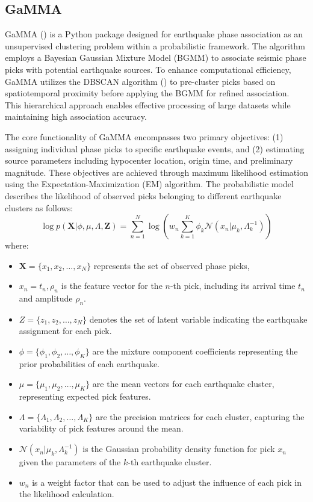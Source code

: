 \subsection{GaMMA}

GaMMA (\cite{GaMMA}) is a Python package designed for earthquake phase
association as an unsupervised clustering problem within a probabilistic
framework. The algorithm employs a Bayesian Gaussian Mixture Model (BGMM) to
associate seismic phase picks with potential earthquake sources. To enhance
computational efficiency, GaMMA utilizes the DBSCAN algorithm (\cite{DBSCAN})
to pre-cluster picks based on spatiotemporal proximity before applying the
BGMM for refined association. This hierarchical approach enables effective
processing of large datasets while maintaining high association accuracy.

The core functionality of GaMMA encompasses two primary objectives: (1)
assigning individual phase picks to specific earthquake events, and (2)
estimating source parameters including hypocenter location, origin time, and
preliminary magnitude. These objectives are achieved through maximum likelihood
estimation using the Expectation-Maximization (EM) algorithm. The probabilistic
model describes the likelihood of observed picks belonging to different
earthquake clusters as follows:
\begin{equation}
  \log p(\mathbf{X}|\phi, \mu, \Lambda, \mathbf{Z}) = \sum_{n=1}^{N} \log
  \left( w_n\sum_{k=1}^{K} \phi_k \mathcal{N}\left(x_n|\mu_k,
  \Lambda_k^{-1}\right) \right)
\end{equation}
where:
\begin{itemize}
  \item $\mathbf{X} = \{x_1, x_2, \ldots, x_N\}$ represents the set of observed
    phase picks,
  \item $x_n = {t_n, \rho_n}$ is the feature vector for the $n$-th pick,
    including its arrival time $t_n$ and amplitude $\rho_n$.
  \item $Z = \{z_1, z_2, \ldots, z_N\}$ denotes the set of latent variable
    indicating the earthquake assignment for each pick.
  \item $\phi = \{\phi_1, \phi_2, \ldots, \phi_K\}$ are the mixture component
    coefficients representing the prior probabilities of each earthquake.
  \item $\mu = \{\mu_1, \mu_2, \ldots, \mu_K\}$ are the mean vectors for each
    earthquake cluster, representing expected pick features.
  \item $\Lambda = \{\Lambda_1, \Lambda_2, \ldots, \Lambda_K\}$ are the
    precision matrices for each cluster, capturing the variability of pick
    features around the mean.
  \item $\mathcal{N}(x_n|\mu_k, \Lambda_k^{-1})$ is the Gaussian probability
    density function for pick $x_n$ given the parameters of the
    $k$-th earthquake
    cluster.
  \item $w_n$ is a weight factor that can be used to adjust the influence of
    each pick in the likelihood calculation.
\end{itemize}

